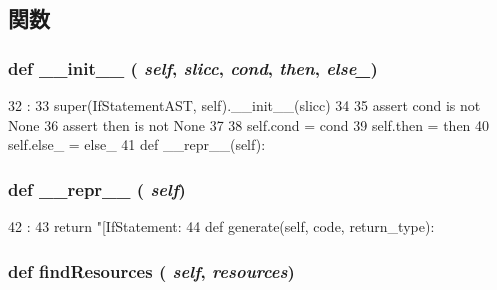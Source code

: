 \subsection{関数}
\hypertarget{classslicc_1_1ast_1_1IfStatementAST_1_1IfStatementAST_ac775ee34451fdfa742b318538164070e}{
\subsubsection[{\_\-\_\-init\_\-\_\-}]{\setlength{\rightskip}{0pt plus 5cm}def \_\-\_\-init\_\-\_\- ( {\em self}, \/   {\em slicc}, \/   {\em cond}, \/   {\em then}, \/   {\em else\_\-})}}
\label{classslicc_1_1ast_1_1IfStatementAST_1_1IfStatementAST_ac775ee34451fdfa742b318538164070e}



\begin{DoxyCode}
32                                                 :
33         super(IfStatementAST, self).__init__(slicc)
34 
35         assert cond is not None
36         assert then is not None
37 
38         self.cond = cond
39         self.then = then
40         self.else_ = else_
41 
    def __repr__(self):
\end{DoxyCode}
\hypertarget{classslicc_1_1ast_1_1IfStatementAST_1_1IfStatementAST_ad8b9328939df072e4740cd9a63189744}{
\subsubsection[{\_\-\_\-repr\_\-\_\-}]{\setlength{\rightskip}{0pt plus 5cm}def \_\-\_\-repr\_\-\_\- ( {\em self})}}
\label{classslicc_1_1ast_1_1IfStatementAST_1_1IfStatementAST_ad8b9328939df072e4740cd9a63189744}



\begin{DoxyCode}
42                       :
43         return "[IfStatement: %
44 
    def generate(self, code, return_type):
\end{DoxyCode}
\hypertarget{classslicc_1_1ast_1_1IfStatementAST_1_1IfStatementAST_abd195c795639b490ba2de4c1246105f1}{
\subsubsection[{findResources}]{\setlength{\rightskip}{0pt plus 5cm}def findResources ( {\em self}, \/   {\em resources})}}
\label{classslicc_1_1ast_1_1IfStatementAST_1_1IfStatementAST_abd195c795639b490ba2de4c1246105f1}


